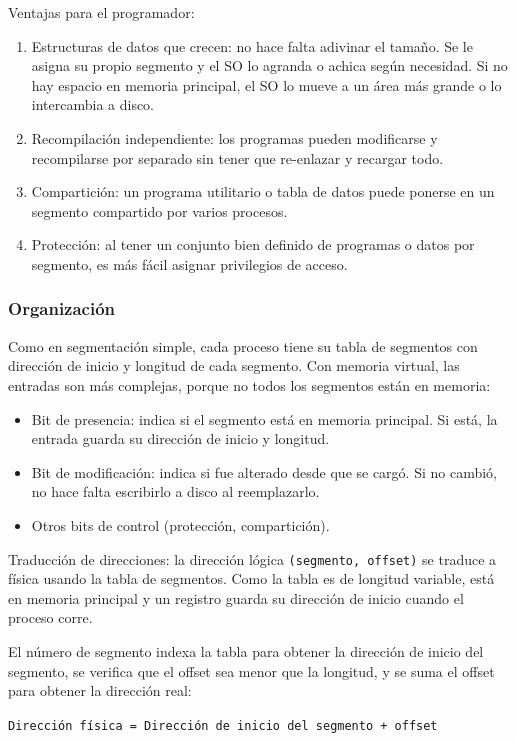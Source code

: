 Ventajas para el programador:
\begin{enumerate}
  \item Estructuras de datos que crecen: no hace falta adivinar el tamaño. Se le asigna su propio segmento y el SO lo agranda o achica según necesidad. Si no hay espacio en memoria principal, el SO lo mueve a un área más grande o lo intercambia a disco.
  \item Recompilación independiente: los programas pueden modificarse y recompilarse por separado sin tener que re-enlazar y recargar todo.
  \item Compartición: un programa utilitario o tabla de datos puede ponerse en un segmento compartido por varios procesos.
  \item Protección: al tener un conjunto bien definido de programas o datos por segmento, es más fácil asignar privilegios de acceso.
\end{enumerate}

\subsubsection{Organización}

Como en segmentación simple, cada proceso tiene su tabla de segmentos con dirección de inicio y longitud de cada segmento. Con memoria virtual, las entradas son más complejas, porque no todos los segmentos están en memoria:
\begin{itemize}
  \item Bit de presencia: indica si el segmento está en memoria principal. Si está, la entrada guarda su dirección de inicio y longitud.
  \item Bit de modificación: indica si fue alterado desde que se cargó. Si no cambió, no hace falta escribirlo a disco al reemplazarlo.
  \item Otros bits de control (protección, compartición).
\end{itemize}

Traducción de direcciones: la dirección lógica \texttt{(segmento, offset)} se traduce a física usando la tabla de segmentos. Como la tabla es de longitud variable, está en memoria principal y un registro guarda su dirección de inicio cuando el proceso corre.

El número de segmento indexa la tabla para obtener la dirección de inicio del segmento, se verifica que el offset sea menor que la longitud, y se suma el offset para obtener la dirección real:
\begin{center}
\texttt{Dirección física = Dirección de inicio del segmento + offset}
\end{center}

